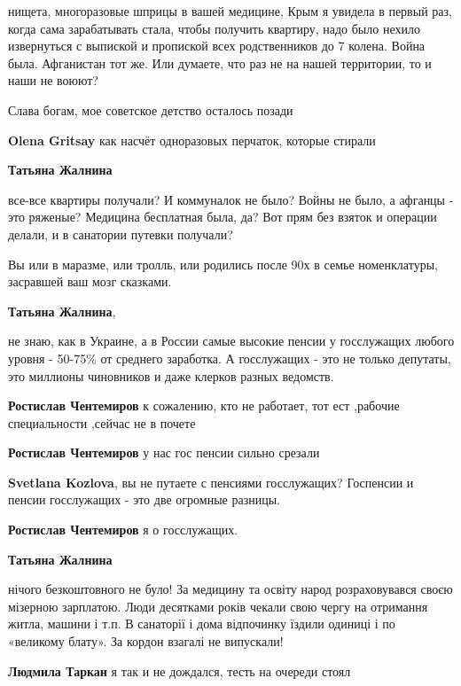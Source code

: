 \begin{itemize}
\begin{itemize}
нищета, многоразовые шприцы в вашей медицине, Крым я увидела в первый раз,
когда сама зарабатывать стала, чтобы получить квартиру, надо было нехило
извернуться с выпиской и пропиской всех родственников до 7 колена. Война была.
Афганистан тот же. Или думаете, что раз не на нашей территории, то и наши не
воюют?

Слава богам, мое советское детство осталось позади

\textbf{Olena Gritsay} как насчёт одноразовых перчаток, которые стирали

\textbf{Татьяна Жалнина} 

все-все квартиры получали? И коммуналок не было? Войны не было, а афганцы - это
ряженые? Медицина бесплатная была, да? Вот прям без взяток и операции делали, и
в санатории путевки получали?

Вы или в маразме, или тролль, или родились после 90х в семье номенклатуры,
засравшей ваш мозг сказками.


\textbf{Татьяна Жалнина}, 

не знаю, как в Украине, а в России самые высокие пенсии у госслужащих любого
уровня - 50-75\% от среднего заработка. А госслужащих - это не только депутаты,
это миллионы чиновников и даже клерков разных ведомств.

\begin{itemize} %
\textbf{Ростислав Чентемиров} к сожалению, кто не работает, тот ест ,рабочие специальности ,сейчас не в почете

\textbf{Ростислав Чентемиров} у нас гос пенсии сильно срезали

\textbf{Svetlana Kozlova}, вы не путаете с пенсиями госслужащих? Госпенсии и пенсии госслужащих - это две огромные разницы.

\textbf{Ростислав Чентемиров} я о госслужащих.
\end{itemize} %

\textbf{Татьяна Жалнина} 

нічого безкоштовного не було! За медицину та освіту народ розраховувався своєю
мізерною зарплатою. Люди десятками років чекали свою чергу на отримання житла,
машини і т.п. В санаторії і дома відпочинку їздили одиниці і по «великому
блату». За кордон взагалі не випускали!

\begin{itemize} %
\textbf{Людмила Таркан} я так и не дождался, тесть на очереди стоял
\end{itemize} %


\end{itemize}
\end{itemize}
